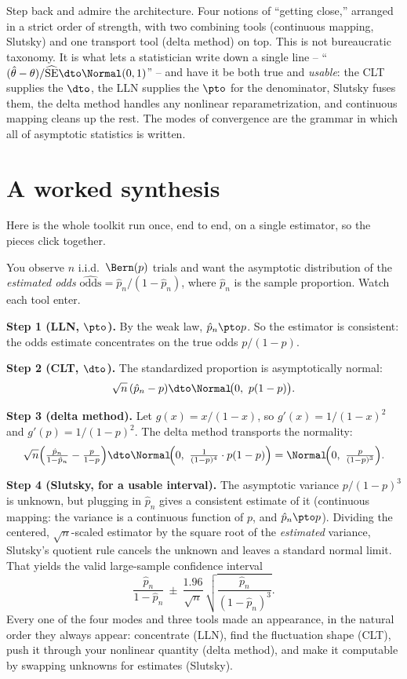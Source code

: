 \begin{aestheticbox}
Step back and admire the architecture. Four notions of ``getting close,'' arranged in a
strict order of strength, with two combining tools (continuous mapping, Slutsky) and one
transport tool (delta method) on top. This is not bureaucratic taxonomy. It is what lets
a statistician write down a single line -- ``$(\hat\theta-\theta)/\widehat{\mathrm{SE}}
\dto\Normal(0,1)$'' -- and have it be both true and \emph{usable}: the CLT supplies the
$\dto$, the LLN supplies the $\pto$ for the denominator, Slutsky fuses them, the delta
method handles any nonlinear reparametrization, and continuous mapping cleans up the
rest. The modes of convergence are the grammar in which all of asymptotic statistics is
written.
\end{aestheticbox}

\section{A worked synthesis}
\label{ch22:synthesis}

Here is the whole toolkit run once, end to end, on a single estimator, so the pieces
click together.

\begin{example}
\label{ch22:ex-odds}
You observe $n$ i.i.d.\ $\Bern(p)$ trials and want the asymptotic distribution of the
\emph{estimated odds} $\widehat{\text{odds}} = \hat p_n/(1-\hat p_n)$, where
$\hat p_n$ is the sample proportion. Watch each tool enter.

\textbf{Step 1 (LLN, $\pto$).} By the weak law, $\hat p_n\pto p$. So the estimator is
consistent: the odds estimate concentrates on the true odds $p/(1-p)$.

\textbf{Step 2 (CLT, $\dto$).} The standardized proportion is asymptotically normal:
\[
  \sqrt n\,(\hat p_n - p)\dto\Normal\!\big(0,\ p(1-p)\big).
\]

\textbf{Step 3 (delta method).} Let $g(x)=x/(1-x)$, so
$g'(x)=1/(1-x)^2$ and $g'(p)=1/(1-p)^2$. The delta method transports the normality:
\[
  \sqrt n\Big(\tfrac{\hat p_n}{1-\hat p_n}-\tfrac{p}{1-p}\Big)
  \dto \Normal\!\Big(0,\ \tfrac{1}{(1-p)^4}\cdot p(1-p)\Big)
  = \Normal\!\Big(0,\ \tfrac{p}{(1-p)^3}\Big).
\]

\textbf{Step 4 (Slutsky, for a usable interval).} The asymptotic variance
$p/(1-p)^3$ is unknown, but plugging in $\hat p_n$ gives a consistent estimate of it
(continuous mapping: the variance is a continuous function of $p$, and $\hat p_n\pto
p$). Dividing the centered, $\sqrt n$-scaled estimator by the square root of the
\emph{estimated} variance, Slutsky's quotient rule cancels the unknown and leaves a
standard normal limit. That yields the valid large-sample confidence interval
\[
  \frac{\hat p_n}{1-\hat p_n}\ \pm\ \frac{1.96}{\sqrt n}\,
  \sqrt{\frac{\hat p_n}{(1-\hat p_n)^3}}.
\]
Every one of the four modes and three tools made an appearance, in the natural order
they always appear: concentrate (LLN), find the fluctuation shape (CLT), push it
through your nonlinear quantity (delta method), and make it computable by swapping
unknowns for estimates (Slutsky).
\end{example}


